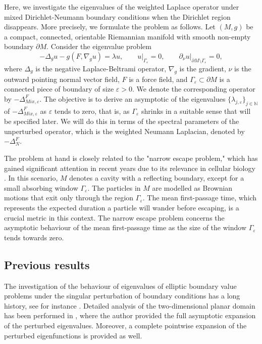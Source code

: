 \documentclass[12pt,a4paper]{amsart}
\numberwithin{equation}{section}
\theoremstyle{plain}
\theoremstyle{definition}
\begin{document}
	Here, we investigate the eigenvalues of the weighted Laplace operator under mixed Dirichlet-Neumann boundary conditions when the Dirichlet region disappears. More precisely, we formulate the problem as follows. Let $(M,g)$ be a compact, connected, orientable Riemannian manifold with smooth non-empty boundary $\partial M$. Consider the eigenvalue problem
	\begin{equation}\label{eig_val_prob}
		-\Delta_g u - g(F,\nabla_g u) = \lambda u, \qquad \left.u\right|_{\Gamma_\varepsilon} = 0,\qquad \left.\partial_\nu u\right|_{\partial M\setminus\Gamma_\varepsilon} = 0,
	\end{equation}
	where $\Delta_g$ is the negative Laplace-Beltrami operator, $\nabla_g$ is the gradient, $\nu$ is the outward pointing normal vector field, $F$ is a force field, and $\Gamma_\varepsilon\subset \partial M$ is a connected piece of boundary of size $\varepsilon>0$. We denote the corresponding operator by $-\Delta_{Mix,\varepsilon}^F$. The objective is to derive an asymptotic of the eigenvalues $\{\lambda_{j,\varepsilon}\}_{j\in \mathbb{N}}$ of $-\Delta_{Mix,\varepsilon}^F$ as $\varepsilon$ tends to zero, that is, as $\Gamma_\varepsilon$ shrinks in a suitable sense that will be specified later. We will do this in terms of the spectral parameters of the unperturbed operator, which is the weighted Neumann Laplacian, denoted by $-\Delta_N^F$.
	
	The problem at hand is closely related to the "narrow escape problem," which has gained significant attention in recent years due to its relevance in cellular biology \cite{holcman2015stochastic,BressloffNewby}. In this scenario, $M$ denotes a cavity with a reflecting boundary, except for a small absorbing window $\Gamma_\varepsilon$. The particles in $M$ are modelled as Brownian motions that exit only through the region $\Gamma_\varepsilon$. The mean first-passage time, which represents the expected duration a particle will wander before escaping, is a crucial metric in this context. The narrow escape problem concerns the asymptotic behaviour of the mean first-passage time as the size of the window $\Gamma_\varepsilon$ tends towards zero.
	
	\subsection{Previous results} The investigation of the behaviour of eigenvalues of elliptic boundary value problems under the singular perturbation of boundary conditions has a long history, see for instance \cite{AbatangeloFelliLena,ammari,Borisov2003Izvest,BorisovSibMatZh,Cherdantsev,FelliNorisOgnibene,FelliNorisOgnibene2022,GadylshinDiffUrav,Gadylshin1993,Gadylshin1998AlgAnal,GadylshinRepevskiiShishkinaJMS,nursultanovTradTzouTzou,Planida2005,EswarathasanKolokolnikov}. Detailed analysis of the two-dimensional planar domain has been performed in \cite{Gadylshin1993}, where the author provided the full asymptotic expansion of the perturbed eigenvalues. Moreover, a complete pointwise expansion of the perturbed eigenfunctions is provided as well.
	
\end{document}

